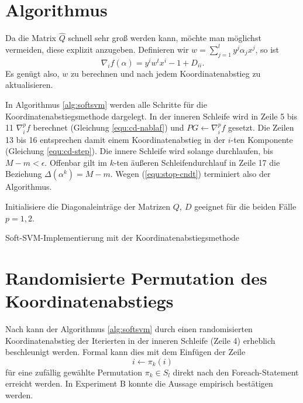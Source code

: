 \section{Algorithmus}
Da die Matrix $\hat{Q}$ schnell sehr groß werden kann, möchte man möglichst vermeiden, diese explizit anzugeben. Definieren wir $w = \sum_{j=1}^{l} y^j \alpha_j x^j$, so ist 
\begin{equation}
\label{equ:cd-nablaf}
\nabla_i f(\alpha) = y^i w^t x^i -1 + D_{ii}.
\end{equation}
Es genügt also, $w$ zu berechnen und nach jedem Koordinatenabstieg zu aktualisieren.


In Algorithmus \ref{alg:softsvm} werden alle Schritte für die Koordinatenabstiegsmethode dargelegt. In der inneren Schleife wird in Zeile 5 bis 11 $\nabla_i^pf$ berechnet (Gleichung \ref{equ:cd-nablaf}) und $PG \gets \nabla_i^pf$ gesetzt. Die Zeilen 13 bis 16 entsprechen damit einem Koordinatenabstieg in der $i$-ten Komponente (Gleichung \ref{equ:cd-step}). Die innere Schleife wird solange durchlaufen, bis $M-m < \epsilon$. Offenbar gilt im $k$-ten äußeren Schleifendurchlauf in Zeile 17 die Beziehung $\Delta(\alpha^k) = M-m$. Wegen (\ref{equ:stop-cndt}) terminiert also der Algorithmus.

\begin{algorithm}[hbtp]
Initialisiere die Diagonaleinträge der Matrizen $Q,\ D$ geeignet für die beiden Fälle $p=1,2$.\;
\caption{Soft-SVM-Implementierung mit der Koordinatenabstiegsmethode}
\label{alg:softsvm}
\end{algorithm}

\section{Randomisierte Permutation des Koordinatenabstiegs}
Nach \cite{hcl-ddms-08} kann der Algorithmus \ref{alg:softsvm} durch einen randomisierten Koordinatenabstieg der Iterierten in der inneren Schleife (Zeile 4) erheblich beschleunigt werden. Formal kann dies mit dem Einfügen der Zeile 
$$
	i \gets \pi_k(i)
$$ 
für eine zufällig gewählte Permutation $\pi_k \in S_l$ direkt nach den Foreach-Statement erreicht werden. In Experiment B konnte die Aussage empirisch bestätigen werden. 

